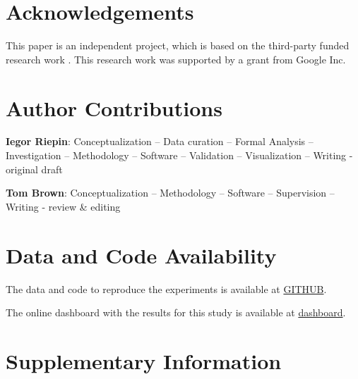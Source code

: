 \documentclass[11pt, 5p, nopreprintline]{elsarticle}
\begin{document}
\section*{Acknowledgements}

This paper is an independent project, which is based on the third-party funded 
research work \cite{Riepin-report-2022}. This research work was supported by a grant from Google Inc. 

\section*{Author Contributions}


\textbf{Iegor Riepin}:
Conceptualization --
Data curation --
Formal Analysis --
Investigation --
Methodology --
Software --
Validation --
Visualization --
Writing - original draft

\textbf{Tom Brown}:
Conceptualization --
Methodology --
Software --
Supervision --
Writing - review \& editing

\section*{Data and Code Availability}
\label{sec:code}

The data and code to reproduce the experiments is available at \href{https://github.com/repository}{GITHUB}.

The online dashboard with the results for this study is available at \url{dashboard}.  

\printglossary[type=\acronymtype]

\renewcommand{\ttdefault}{\sfdefault}



\newpage

\makeatletter
\renewcommand \thesection{S\@arabic\c@section}
\renewcommand\thetable{S\@arabic\c@table}
\renewcommand \thefigure{S\@arabic\c@figure}
\makeatother
\renewcommand{\citenumfont}[1]{S#1}
\setcounter{equation}{0}
\setcounter{figure}{0}
\setcounter{table}{0}
\setcounter{section}{0}


\section{Supplementary Information}
\label{sec:si}
 



\renewcommand{\ttdefault}{\sfdefault}
\end{document}

